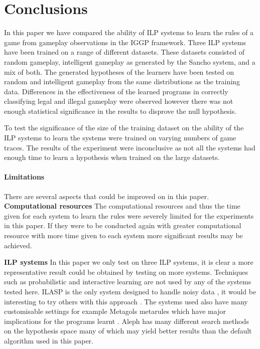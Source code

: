 \chapter{Conclusions}
In this paper we have compared the ability of ILP systems to learn the rules of a game from gameplay observations in the IGGP framework. Three ILP systems have been trained on a range of different datasets. These datasets consisted of random  gameplay, intelligent gameplay as generated by the Sancho system, and a mix of both. The generated hypotheses of the learners have been tested on random and intelligent gameplay from the same distributions as the training data. Differences in the effectiveness of the learned programs in correctly classifying legal and illegal gameplay were observed however there was not enough statistical significance in the results to disprove the null hypothesis.

To test the significance of the size of the training dataset on the ability of the ILP systems to learn the systems were trained on varying numbers of game traces. The results of the experiment were inconclusive as not all the systems had enough time to learn a hypothesis when trained on the large datasets.


\subsubsection{Limitations}
There are several aspects that could be improved on in this paper.
\\

\textbf{Computational resources}
The computational resources and thus the time given for each system to learn the rules were severely limited for the experiments in this paper. If they were to be conducted again with greater computational resource with more time given to each system more significant results may be achieved.

\textbf{ILP systems} In this paper we only test on three ILP systems, it is clear a more representative result could be obtained by testing on more systems. Techniques such as probabilistic \cite{Bellodi/Probablistic,Raedt/Probabalistic} and interactive \cite{Raedt/Interactive} learning are not used by any of the systems tested here. ILASP is the only system designed to handle noisy data \cite{MarkLaw/ILASP2i}, it would be interesting to try others with this approach \cite{Oblak/Noise,Evans/Noise}. The systems used also have many customisable settings for example Metagols metarules which have major implications for the programs learnt \cite{Cropper/Metarules}. Aleph has many different search methods on the hypothesis space many of which may yield better results than the default algorithm used in this paper.

